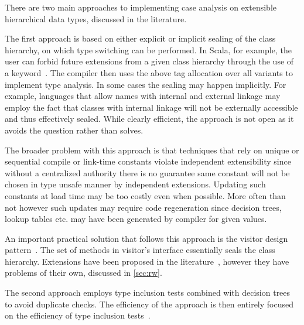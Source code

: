 \noindent
There are two main approaches to implementing case analysis on extensible 
hierarchical data types, discussed in the literature.

The first approach is based on either explicit or implicit sealing of the class 
hierarchy, on which type switching can be performed. In Scala, for example, the 
user can forbid future extensions from a given class hierarchy through the use 
of a  keyword~\cite[.2]{EmirThesis}. The compiler 
then uses the above tag allocation over all variants to implement type analysis.
In some cases the sealing may happen implicitly. For example, languages that 
allow names with internal and external linkage may employ the fact that classes 
with internal linkage will not be externally accessible and thus effectively 
sealed. While clearly efficient, the approach is not open as it avoids the 
question rather than solves. 

The broader problem with this approach is that techniques that rely on unique or
sequential compile or link-time constants violate independent extensibility 
since without a centralized authority there is no guarantee same constant will 
not be chosen in type unsafe manner by independent extensions. Updating such 
constants at load time may be too costly even when possible. More often than 
not however such updates may require code regeneration since decision trees, 
lookup tables etc. may have been generated by compiler for given values.

An important practical solution that follows this approach is the visitor design 
pattern~\cite{DesignPatterns1993}. The set of  methods in visitor's 
interface essentially seals the class hierarchy. Extensions have been proposed 
in the literature~\cite{Zenger:2001}, however they have problems of their own, 
discussed in \textsection\ref{sec:rw}.

The second approach employs type inclusion tests combined with decision 
trees~\cite{Cardelli84} to avoid duplicate checks. The efficiency of the 
approach is then entirely focused on the efficiency of type inclusion 
tests~\cite{Schubert83,Wirth88,Cohen91,Caseau93,Vortex96,Krall97nearoptimal,Vitek97,PQEncoding,FastDynCast,Ducournau08}.

